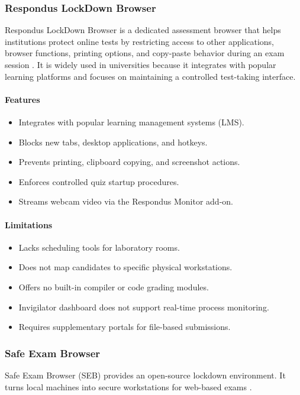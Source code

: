 \subsubsection{Respondus LockDown Browser}
Respondus LockDown Browser is a dedicated assessment browser that helps institutions protect online tests by restricting access to other applications, browser functions, printing options, and copy-paste behavior during an exam session \cite{respondus1}. It is widely used in universities because it integrates with popular learning platforms and focuses on maintaining a controlled test-taking interface.

\paragraph{Features}
\begin{itemize}[noitemsep]
\item Integrates with popular learning management systems (LMS).
\item Blocks new tabs, desktop applications, and hotkeys.
\item Prevents printing, clipboard copying, and screenshot actions.
\item Enforces controlled quiz startup procedures.
\item Streams webcam video via the Respondus Monitor add-on.
\end{itemize}

\paragraph{Limitations}
\begin{itemize}[noitemsep]
\item Lacks scheduling tools for laboratory rooms.
\item Does not map candidates to specific physical workstations.
\item Offers no built-in compiler or code grading modules.
\item Invigilator dashboard does not support real-time process monitoring.
\item Requires supplementary portals for file-based submissions.
\end{itemize}

\subsubsection{Safe Exam Browser}
Safe Exam Browser (SEB) provides an open-source lockdown environment. It turns local machines into secure workstations for web-based exams \cite{seb1}.

